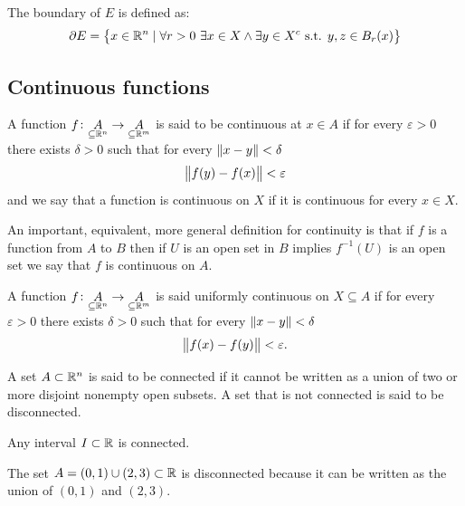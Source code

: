 \documentclass[11pt,a4paper]{article}
\begin{document}
\begin{definition}[Boundary]
  The boundary of $E$ is defined as:
  \[
    \partial E = \left\{x \in \mathbb{R}^n \mid \forall r > 0 \
    \exists x \in X \land \exists y \in X^c \text{ s.t. } y,z\in B_r(x)\right\}
  \]
\end{definition}

\subsection{Continuous functions}

\begin{definition}
  A function 
  $f \colon \underset{\subseteq \mathbb{R}^n}{A} \to \underset{\subseteq \mathbb{R}^m}{A}$ 
  is said to be continuous at $x \in A$ if for every $\varepsilon > 0$
  there exists $\delta > 0$ such that for every $\left\lVert x - y\right\rVert < \delta$
  \[
    \left\lVert f(y) - f(x)\right\rVert < \varepsilon
  \]
  and we say that a function is continuous on $X$ if it is continuous
  for every $x \in X$.
\end{definition}

\begin{remark}
  An important, equivalent, more general definition for continuity is that
  if $f$ is a function from $A$ to $B$ then if $U$ is an open set in $B$
  implies $f^{-1}(U)$ is an open set we say that $f$ is continuous on $A$.
\end{remark}

\begin{definition}
  A function 
  $f \colon \underset{\subseteq \mathbb{R}^n}{A} \to \underset{\subseteq \mathbb{R}^m}{A}$ 
  is said uniformly continuous on $X \subseteq A$ if for every 
  $\varepsilon > 0$ there exists $\delta > 0$ such that for every 
  $\left\lVert x - y\right\rVert < \delta$
  \[
    \left\lVert f(x) - f(y)\right\rVert < \varepsilon.
  \]
\end{definition}

\begin{definition}[Connectedness]
  A set $A \subset \mathbb{R}^n$ is said to be connected if it cannot be
  written as a union of two or more disjoint nonempty open subsets.
  A set that is not connected is said to be disconnected.
\end{definition}

\begin{example}
  Any interval $I \subset \mathbb{R}$ is connected.
\end{example}

\begin{example}
  The set $A = (0,1) \cup (2,3) \subset \mathbb{R}$ is disconnected because
  it can be written as the union of $(0,1)$ and $(2,3)$.
\end{example}
\end{document}
